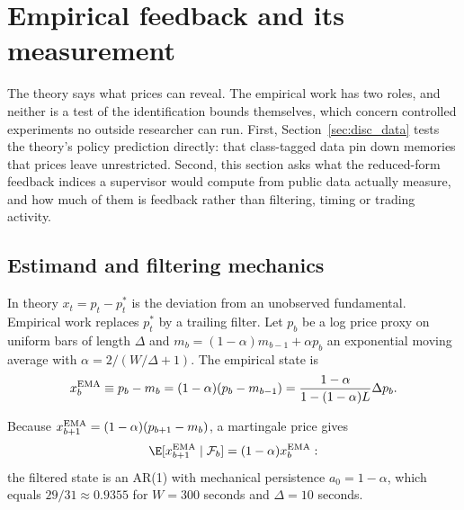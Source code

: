 \section{Empirical feedback and its measurement}\label{sec:empirics}

The theory says what prices can reveal. The empirical work has two roles, and neither is a test of the identification bounds themselves, which concern controlled experiments no outside researcher can run. First, Section~\ref{sec:disc_data} tests the theory's policy prediction directly: that class-tagged data pin down memories that prices leave unrestricted. Second, this section asks what the reduced-form feedback indices a supervisor would compute from public data actually measure, and how much of them is feedback rather than filtering, timing or trading activity.

\subsection{Estimand and filtering mechanics}

In theory $x_t=p_t-p^*_t$ is the deviation from an unobserved fundamental. Empirical work replaces $p^*_t$ by a trailing filter. Let $p_b$ be a log price proxy on uniform bars of length $\Delta$ and $m_b=(1-\alpha)m_{b-1}+\alpha p_b$ an exponential moving average with $\alpha=2/(W/\Delta+1)$. The empirical state is
\begin{equation}\label{eq:ema}
x^{\rm EMA}_b\equiv p_b-m_b=(1-\alpha)(p_b-m_{b-1})=\frac{1-\alpha}{1-(1-\alpha)L}\Delta p_b .
\end{equation}

Because $x^{\rm EMA}_{b+1}=(1-\alpha)(p_{b+1}-m_b)$, a martingale price gives
\begin{equation}\label{eq:mech}
\E[x^{\rm EMA}_{b+1}\mid\mathcal F_b]=(1-\alpha)x^{\rm EMA}_b :
\end{equation}
the filtered state is an AR(1) with mechanical persistence $a_0=1-\alpha$, which equals $29/31\approx0.9355$ for $W=300$ seconds and $\Delta=10$ seconds.

